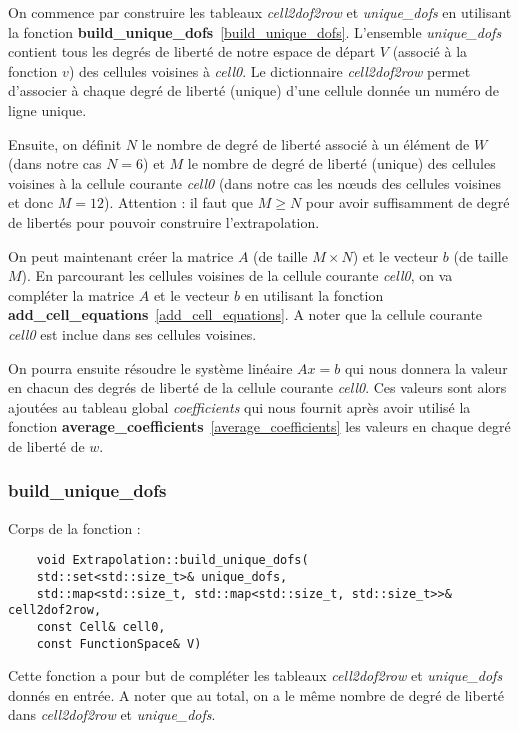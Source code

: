 On commence par construire les tableaux \textit{cell2dof2row} et \textit{unique\_dofs} en utilisant la fonction \textbf{build\_unique\_dofs}~\ref{build_unique_dofs}. L'ensemble \textit{unique\_dofs} contient tous les degrés de liberté de notre espace de départ $V$ (associé à la fonction $v$) des cellules voisines à \textit{cell0}. Le dictionnaire \textit{cell2dof2row} permet d'associer à chaque degré de liberté (unique) d'une cellule donnée un numéro de ligne unique. 

Ensuite, on définit $N$ le nombre de degré de liberté associé à un élément de $W$ (dans notre cas $N=6$) et $M$ le nombre de degré de liberté (unique) des cellules voisines à la cellule courante \textit{cell0} (dans notre cas les nœuds des cellules voisines et donc $M=12$). Attention : il faut que $M\ge N$ pour avoir suffisamment de degré de libertés pour pouvoir construire l'extrapolation.

On peut maintenant créer la matrice $A$ (de taille $M\times N$) et le vecteur $b$ (de taille $M$). En parcourant les cellules voisines de la cellule courante \textit{cell0}, on va compléter la matrice $A$ et le vecteur $b$ en utilisant la fonction \textbf{add\_cell\_equations}~\ref{add_cell_equations}. A noter que la cellule courante \textit{cell0} est inclue dans ses cellules voisines.

On pourra ensuite résoudre le système linéaire $Ax=b$ qui nous donnera la valeur en chacun des degrés de liberté de la cellule courante \textit{cell0}. Ces valeurs sont alors ajoutées au tableau global \textit{coefficients} qui nous fournit après avoir utilisé la fonction \textbf{average\_coefficients}~\ref{average_coefficients} les valeurs en chaque degré de liberté de $w$.

\subsubsection*{build\_unique\_dofs}
\label{build_unique_dofs}

Corps de la fonction :

\begin{lstlisting}
	void Extrapolation::build_unique_dofs(
	std::set<std::size_t>& unique_dofs,
	std::map<std::size_t, std::map<std::size_t, std::size_t>>& cell2dof2row,
	const Cell& cell0,
	const FunctionSpace& V)
\end{lstlisting}

Cette fonction a pour but de compléter les tableaux \textit{cell2dof2row} et \textit{unique\_dofs} donnés en entrée. A noter que au total, on a le même nombre de degré de liberté dans \textit{cell2dof2row} et \textit{unique\_dofs}.\\

